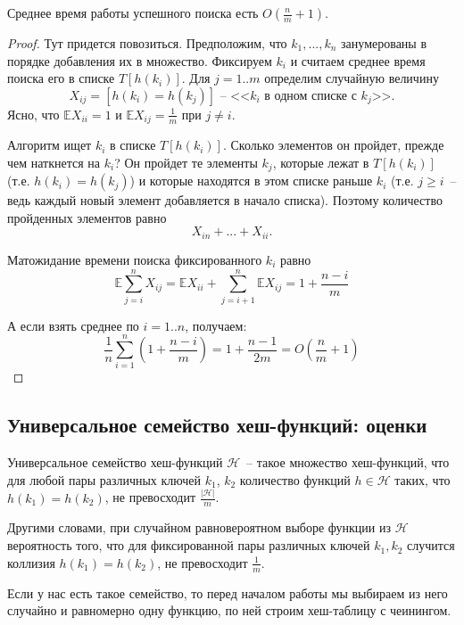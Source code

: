 \begin{theorem*}
	Среднее время работы успешного поиска есть $O\left(\frac{n}{m}+1\right)$.
\end{theorem*}
\begin{proof}
Тут придется повозиться. Предположим, что $k_1, ..., k_n$ занумерованы в порядке добавления их в множество. Фиксируем $k_i$ и считаем среднее время поиска его в списке $T[h(k_i)]$. Для $j=1..m$ определим случайную величину $$X_{ij} = [h(k_i) = h(k_j)] \text{~-- <<$k_i$ в одном списке с $k_j$>>.}$$ Ясно, что $\mathbb E X_{ii} = 1$ и $\mathbb E X_{ij} = \frac{1}{m}$ при $j\neq i$.

Алгоритм ищет $k_i$ в списке $T[h(k_i)]$. Сколько элементов он пройдет, прежде чем наткнется на $k_i$? Он пройдет те элементы $k_j$, которые лежат в $T[h(k_i)]$ (т.е. $h(k_i)=h(k_j)$) и которые находятся в этом списке раньше $k_i$ (т.е. $j\geq i$~-- ведь каждый новый элемент добавляется в начало списка). Поэтому количество пройденных элементов равно $$X_{in} + ... + X_{ii}.$$

Матожидание времени поиска фиксированного $k_i$ равно $$\mathbb E \sum_{j=i}^n X_{ij} = \mathbb E X_{ii} + \sum_{j=i+1}^n \mathbb E X_{ij} = 1 + \frac{n-i}{m}$$

А если взять среднее по $i=1..n$, получаем: $$\frac{1}{n} \sum_{i=1}^n\left(1+\frac{n-i}{m}\right) = 1 + \frac{n-1}{2m} = O\left(\frac{n}{m} + 1\right)$$
\end{proof}

\subsection{Универсальное семейство хеш-функций: оценки}

\begin{definition*}
	Универсальное семейство хеш-функций $\mathcal{H}$~-- такое множество хеш-функций, что для любой пары различных ключей $k_1$, $k_2$ количество функций $h \in \mathcal{H}$ таких, что $h(k_1) = h(k_2)$, не превосходит $\frac{|\mathcal{H}|}{m}$.
\end{definition*}

 Другими словами, при случайном равновероятном выборе функции из $\mathcal{H}$ вероятность того, что для фиксированной пары различных ключей $k_1, k_2$ случится коллизия $h(k_1) = h(k_2)$, не превосходит $\frac{1}{m}$.

Если у нас есть такое семейство, то перед началом работы мы выбираем из него случайно и равномерно одну функцию, по ней строим хеш-таблицу с чеинингом.


